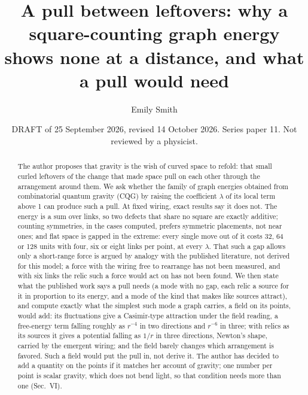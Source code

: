 \documentclass[pre,twocolumn,superscriptaddress,nofootinbib]{revtex4-2}
\begin{document}
\title{A pull between leftovers: why a square-counting graph energy shows none at a distance, and what a pull
would need}

\author{Emily Smith}

\date{DRAFT of 25 September 2026, revised 14 October 2026. Series paper 11. Not reviewed by a physicist.}

\begin{abstract}
The author proposes that gravity is the wish of curved space to refold: that small curled leftovers of the
change that made space pull on each other through the arrangement around them. We ask whether the family of graph
energies obtained from combinatorial quantum gravity (CQG) by raising the coefficient $\lambda$ of its local term above
1 can produce such a pull. At fixed wiring, exact results say it does not. The energy is a sum over links, so two
defects that share no square are exactly additive; counting symmetries, in the cases computed, prefers symmetric
placements, not near ones; and flat space is gapped in the extreme: every single move out of it costs 32, 64 or 128
units with four, six or eight links per point, at every $\lambda$. That such a gap allows only a short-range force is
argued by analogy with the published literature, not derived for this model; a force with the
wiring free to rearrange has not been measured, and with six links the relic such a force would act on has not been
found. We then state what the published work says a pull needs (a mode with no gap, each relic a source for it in
proportion to its energy, and a mode of the kind that makes like sources attract), and compute exactly what the
simplest such mode a graph carries, a field on its points, would add: its fluctuations give a Casimir-type attraction
under the field reading, a free-energy term falling roughly as $r^{-4}$ in two directions and $r^{-6}$ in three; with
relics as its sources it gives a
potential falling as $1/r$ in three directions, Newton's shape, carried by the emergent wiring; and the field barely
changes which arrangement is favored. Such a field would put the pull in, not derive it. The author has decided to
add a quantity on the points if it matches her account of gravity; one number per point is scalar gravity, which
does not bend light, so that condition needs more than one (Sec.~VI).
\end{abstract}

\maketitle
\end{document}
